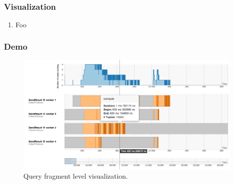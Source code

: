 \documentclass[xetex,mathserif,serif]{beamer}
\begin{document}
\begin{frame}
\frametitle{Visualization}
\begin{enumerate}
	\item Foo
\end{enumerate}
\end{frame}

\begin{frame}
\frametitle{Demo}
\begin{figure}
 \begin{center}
     \includegraphics[width=\textwidth]{figure1}
   \end{center}
  \caption{Query fragment level visualization.}
\end{figure}
\end{frame}
\end{document}
